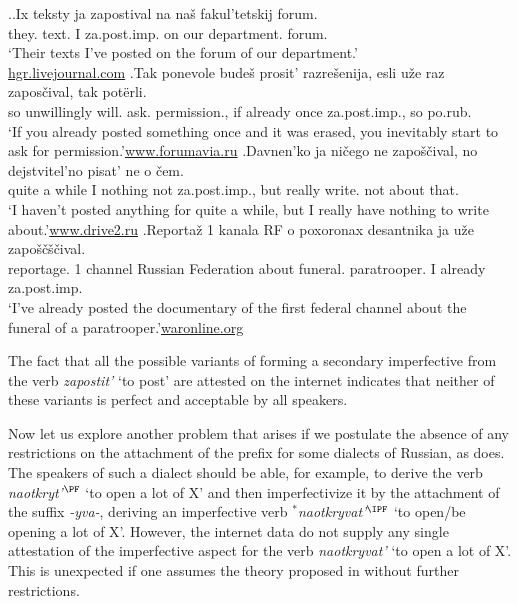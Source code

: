 \ex.\label{ex:zapostivat}\ag.Ix teksty ja zapostival na na\v{s} fakul'tetskij forum.\\
they. text. I za.post.imp. on our department. forum.\\
\trans `Their texts I've posted on the forum of our department.'\\\hbox{}\hfill\hbox{\url{hgr.livejournal.com}}
\bg.Tak ponevole bude\v{s} prosit' razre\v{s}enija, esli u\v{z}e raz zapos\v{c}ival, tak pot\"{e}rli.\\
so unwillingly will. ask. permission., if already once za.post.imp., so po.rub.\\
\trans `If you already posted something once and it was erased, you inevitably start to ask for permission.'\hbox{}\hfill\hbox{\url{www.forumavia.ru}}
\bg.Davnen'ko ja ni\v{c}ego ne zapo\v{s}\v{c}ival, no dejstvitel'no pisat' ne o \v{c}em.\\
{quite a while} I nothing not za.post.imp., but really write. not about that.\\
\trans `I haven't posted anything for quite a while, but I really have nothing to write about.'\hbox{}\hfill\hbox{\url{www.drive2.ru}}
\bg.Reporta\v{z} 1 kanala RF o poxoronax desantnika ja u\v{z}e zapo\v{s}\v{c}\v{s}\v{c}ival.\\
reportage. 1 channel {Russian Federation} about funeral. paratrooper. I already za.post.imp.\\
\trans `I've already posted the documentary of the first federal channel about the funeral of a paratrooper.'\hbox{}\hfill\hbox{\url{waronline.org}}

The fact that all the possible variants of forming a secondary imperfective from the verb \textit{zapostit'} `to post' are attested on the internet indicates that neither of these variants is perfect and acceptable by all speakers.

Now let us explore another problem that arises if we postulate the absence of any restrictions on the attachment of the prefix  for some dialects of Russian, as \citet{Tatevosov:13a} does. The speakers of such a dialect should be able, for example, to derive the verb \textit{naotkryt'}$^{\PF}$ `to open a lot of X' and then imperfectivize it by the attachment of the suffix \textit{-yva-}, deriving an imperfective verb $^*$\textit{naotkryvat'}$^{\IPF}$ `to open/be opening a lot of X'. However, the internet data do not supply any single attestation of the imperfective aspect for the verb \textit{naotkryvat'} `to open a lot of X'. This is unexpected if one assumes the theory proposed in \citet{Tatevosov:13a} without further restrictions.

